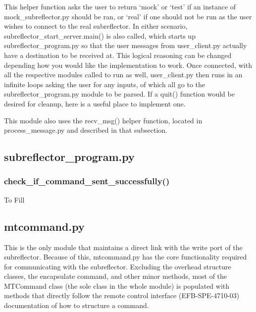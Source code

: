 \documentclass{article}
\begin{document}
This helper function asks the user to return `mock' or `test' if an instance of mock\_subreflector.py should be ran, or `real' if one should not be run as the user wishes to connect to the real subreflector. In either scenario, subreflector\_start\_server.main() is also called, which starts up subreflector\_program.py so that the user messages from user\_client.py actually have a destination to be received at. This logical reasoning can be changed depending how you would like the implementation to work. Once connected, with all the respective modules called to run as well, user\_client.py then runs in an infinite loops asking the user for any inputs, of which all go to the subreflector\_program.py module to be parsed. If a quit() function would be desired for cleanup, here is a useful place to implement one. 

\vspace{10pt}

This module also uses the recv\_msg() helper function, located in process\_message.py and described in that subsection.



\subsection{subreflector\_program.py}



\subsubsection{check\_if\_command\_sent\_successfully() }

To Fill


\subsection{mtcommand.py}

This is the only module that maintains a direct link with the write port of the subreflector. Because of this, mtcommand.py has the core functionality required for communicating with the subreflector. Excluding  the overhead structure classes, the encapsulate command, and other minor methods, most of the MTCommand class (the sole class in the whole module) is populated with methods that directly follow the remote control interface (EFB-SPE-4710-03)  documentation of how to structure a command.
\end{document}

